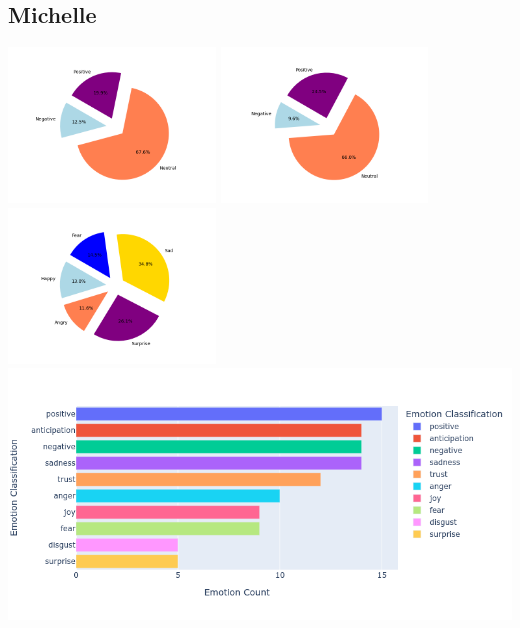 \documentclass[a4paper,12pt]{article}
\begin{document}
	\subsection{Michelle}
	\begin{center}
		{\includegraphics[width=5.5cm]{michellesVaderEmotionalPie.png}}
		{\includegraphics[width=5.5cm]{michellesBlobEmotionalPie.png}}
		{\includegraphics[width=5.5cm]{michellesEmotionalPie.png}}\\
		{\includegraphics[width=16cm]{michelleNrcImage.png}}\\
	\end{center}
	\clearpage
\end{document}
